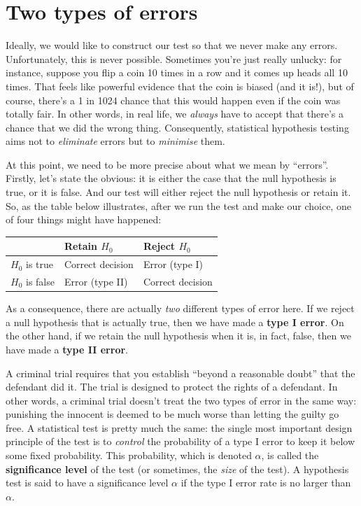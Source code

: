 \documentclass[
  11pt,
  a4paper,
  twoside,symmetric,openright]{book}
\theoremstyle{break}
\theoremstyle{break}
\begin{document}
\section{Two types of errors}\label{errortypes}

Ideally, we would like to construct our test so that we never make any errors. Unfortunately, this is never possible. Sometimes you're just really unlucky: for instance, suppose you flip a coin 10 times in a row and it comes up heads all 10 times. That feels like powerful evidence that the coin is biased (and it is!), but of course, there's a 1 in 1024 chance that this would happen even if the coin was totally fair. In other words, in real life, we \emph{always} have to accept that there's a chance that we did the wrong thing. Consequently, statistical hypothesis testing aims not to \emph{eliminate} errors but to \emph{minimise} them.

At this point, we need to be more precise about what we mean by ``errors''. Firstly, let's state the obvious: it is either the case that the null hypothesis is true, or it is false. And our test will either reject the null hypothesis or retain it. So, as the table below illustrates, after we run the test and make our choice, one of four things might have happened:

\begin{longtable}[]{@{}lll@{}}
\toprule\noalign{}
& Retain \(H_0\) & Reject \(H_0\) \\
\midrule\noalign{}
\endhead
\bottomrule\noalign{}
\endlastfoot
\(H_0\) is true & Correct decision & Error (type I) \\
\(H_0\) is false & Error (type II) & Correct decision \\
\end{longtable}

As a consequence, there are actually \emph{two} different types of error here. If we reject a null hypothesis that is actually true, then we have made a \textbf{type I error}. On the other hand, if we retain the null hypothesis when it is, in fact, false, then we have made a \textbf{type II error}.

A criminal trial requires that you establish ``beyond a reasonable doubt'' that the defendant did it. The trial is designed to protect the rights of a defendant. In other words, a criminal trial doesn't treat the two types of error in the same way: punishing the innocent is deemed to be much worse than letting the guilty go free. A statistical test is pretty much the same: the single most important design principle of the test is to \emph{control} the probability of a type I error to keep it below some fixed probability. This probability, which is denoted \(\alpha\), is called the \textbf{significance level} of the test (or sometimes, the \emph{size} of the test). A hypothesis test is said to have a significance level \(\alpha\) if the type I error rate is no larger than \(\alpha\).
\end{document}
